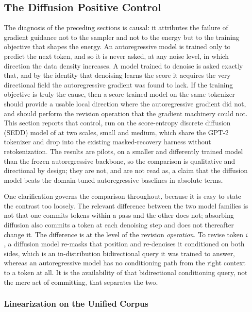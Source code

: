 \subsection{The Diffusion Positive Control}
\label{sec:results-diffusion}

The diagnosis of the preceding sections is causal: it attributes the failure of gradient guidance not to the sampler and not to the energy but to the training objective that shapes the energy. An autoregressive model is trained only to predict the next token, and so it is never asked, at any noise level, in which direction the data density increases. A model trained to denoise is asked exactly that, and by the identity that denoising learns the score \citep{vincent2011connection} it acquires the very directional field the autoregressive gradient was found to lack. If the training objective is truly the cause, then a score-trained model on the same tokenizer should provide a usable local direction where the autoregressive gradient did not, and should perform the revision operation that the gradient machinery could not. This section reports that control, run on the score-entropy discrete diffusion (SEDD) model of \citet{lou2024discrete} at two scales, small and medium, which share the GPT-2 tokenizer and drop into the existing masked-recovery harness without retokenization. The results are pilots, on a smaller and differently trained model than the frozen autoregressive backbone, so the comparison is qualitative and directional by design; they are not, and are not read as, a claim that the diffusion model beats the domain-tuned autoregressive baselines in absolute terms.

One clarification governs the comparison throughout, because it is easy to state the contrast too loosely. The relevant difference between the two model families is not that one commits tokens within a pass and the other does not; absorbing diffusion also commits a token at each denoising step and does not thereafter change it. The difference is at the level of the revision \emph{operation}. To revise token $i$, a diffusion model re-masks that position and re-denoises it conditioned on both sides, which is an in-distribution bidirectional query it was trained to answer, whereas an autoregressive model has no conditioning path from the right context to a token at all. It is the availability of that bidirectional conditioning query, not the mere act of committing, that separates the two.

\subsubsection{Linearization on the Unified Corpus}
\label{sec:results-diffusion-lin}

